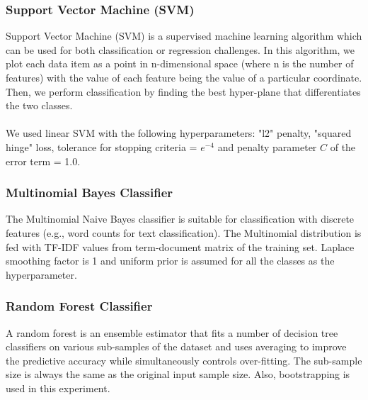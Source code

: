 \documentclass[a4paper, 14pt]{article}
\begin{document}
\begin{justify}
\begin{justify}
\subsubsection{Support Vector Machine (SVM)}
\begin{justify}

Support Vector Machine (SVM) is a supervised machine learning algorithm which can be used for both classification or regression challenges. In this algorithm, we plot each data item as a point in n-dimensional space (where n is the number of features) with the value of each feature being the value of a particular coordinate. Then, we perform classification by finding the best hyper-plane that differentiates the two classes.
\\ \\
We used linear SVM with the following hyperparameters: "l2" penalty, "squared hinge" loss, tolerance for stopping criteria = ${e^{-4}}$  and penalty parameter $C$ of the error term = 1.0.
\end{justify}
\subsubsection{Multinomial Bayes Classifier}
\begin{justify}

The Multinomial Naive Bayes classifier is suitable for classification with discrete features (e.g., word counts for text classification). The Multinomial distribution is fed with TF-IDF values from term-document matrix of the training set. Laplace smoothing factor is 1 and uniform prior is assumed for all the classes as the hyperparameter.
\end{justify}

\subsubsection{Random Forest Classifier}
\begin{justify}
A random forest is an ensemble estimator that fits a number of decision tree classifiers on various sub-samples of the dataset and uses averaging to improve the predictive accuracy while simultaneously controls over-fitting. 
The sub-sample size is always the same as the original input sample size. Also, bootstrapping is used in this experiment.
\end{justify}



\end{justify}




\end{justify}
\end{document}
